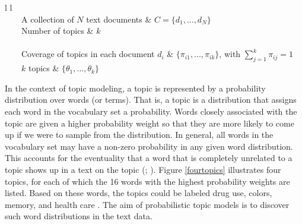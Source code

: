 \documentclass[11pt,a4paper,english,oneside]{book}
\newcommand{\tabitem}{~~\llap{\textbullet}~~}
\numberwithin{equation}{chapter}
\begin{document}
\begin{table}[h] %
	\centering %
	\begin{tabular}{ l  l  } %
		\toprule %
		 \\
		\midrule %
		\tabitem A collection of $N$  text documents & $C=\{d_1,...,d_N\}$ \\
		\tabitem Number of topics & $k$ \\
		\midrule
		 \\
		\midrule
		\tabitem Coverage of topics in each document $d_i$ & $\{\pi_{i1}, ..., \pi_{ik}\}$, with $\sum_{j=1}^{k} \pi_{ij} = 1$\\
		\tabitem $k$ topics & $\{\theta_1, ..., \theta_k\}$\\ %
		\bottomrule %
	\end{tabular}
	\caption{Formal definition of a topic modeling task.} %
	\label{tab:task} %
\end{table}

In the context of topic modeling, a topic is represented by a probability distribution over words (or terms). That is, a topic is a distribution that assigns each word in the vocabulary set a probability. Words closely associated with the topic are given a higher probability weight so that they are more likely to come up if we were to sample from the distribution. In general, all words in the vocabulary set may have a non-zero probability in any given word distribution. This accounts for the eventuality that a word that is completely unrelated to a topic shows up in a text on the topic (\citealt[pp.~335--337]{Zhai.2016}; \citealt[p.~994]{Blei.2003}). Figure \ref{fourtopics} illustrates four topics, for each of which the 16 words with the highest probability weights are listed. Based on these words, the topics could be labeled drug use, colors, memory, and health care \cite[p. 2]{Steyvers(2007)}. The aim of probabilistic topic models is to discover such word distributions in the text data. 
\end{document}
